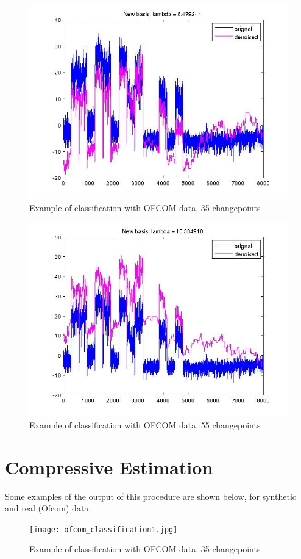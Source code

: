 \begin{figure}[h]
\centering
\includegraphics[height = 7.3 cm]{new_basis_ofcom_3.jpg}
\caption{Example of classification with OFCOM data, 35 changepoints}
\label{fig:hvb}
\end{figure}

\begin{figure}[h]
\centering
\includegraphics[height = 7.3 cm]{new_basis_ofcom_4.jpg}
\caption{Example of classification with OFCOM data, 55 changepoints}
\label{fig:hvb}
\end{figure}


\section{Compressive Estimation}

Some examples of the output of this procedure are shown below, for synthetic and real (Ofcom) data.

\begin{figure}[h]
\centering
\texttt{[image: ofcom\_classification1.jpg]}
\caption{Example of classification with OFCOM data, 35 changepoints}
\label{fig:hvb}
\end{figure}

